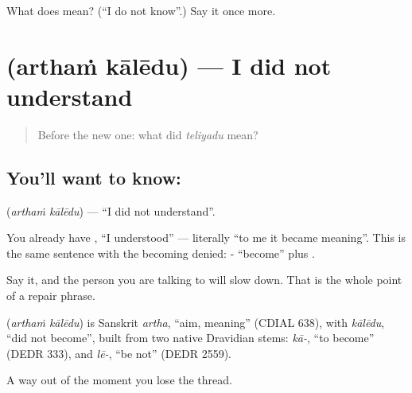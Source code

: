 \begin{tcolorbox}[breakable,colback=teal!4,colframe=teal!35!black,title={Before you move on}]
What does   mean? (\textquotedblleft{}I do not know\textquotedblright{}.) Say it once more.
\end{tcolorbox}
\section[\texorpdfstring{\te{అర్థం} \te{కాలేదు} (arthaṁ kālēdu)}{అర్థం కాలేదు (arthaṁ kālēdu)}]{  (arthaṁ kālēdu) — I did not understand}

\label{lesson:TE-C78-didntunderstand}



\begin{quote}
Before the new one: what did \emph{teliyadu} mean?
\end{quote}

\subsection*{You'll want to know:  }
\textbf{ } (\emph{arthaṁ kālēdu}) — \textquotedblleft{}I did not understand\textquotedblright{}.

You already have \textbf{ }, \textquotedblleft{}I understood\textquotedblright{} — literally \textquotedblleft{}to me it became meaning\textquotedblright{}. This is the same sentence with the becoming denied: - \textquotedblleft{}become\textquotedblright{} plus .

Say it, and the person you are talking to will slow down. That is the whole point of a repair phrase.

\begin{cousinweb}
\textbf{ } (\emph{arthaṁ kālēdu}) is Sanskrit \emph{artha}, \textquotedblleft{}aim, meaning\textquotedblright{} (CDIAL 638), with \emph{kālēdu}, \textquotedblleft{}did not become\textquotedblright{}, built from two native Dravidian stems: \emph{kā-}, \textquotedblleft{}to become\textquotedblright{} (DEDR 333), and \emph{lē-}, \textquotedblleft{}be not\textquotedblright{} (DEDR 2559).
\end{cousinweb}

\begin{grammarlens}[title={What you've built}]
A way out of the moment you lose the thread.
\end{grammarlens}

